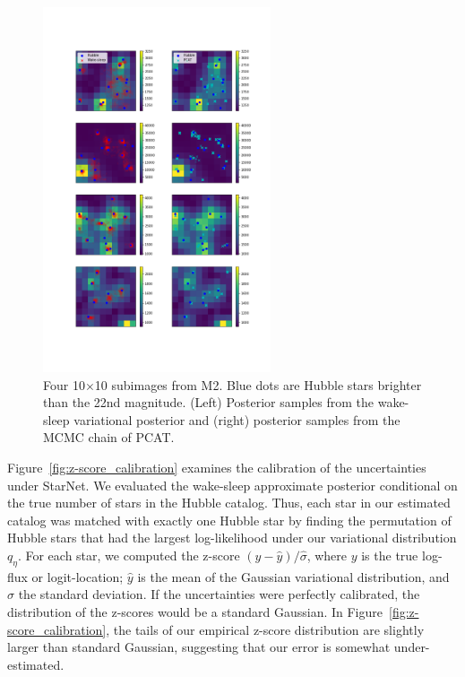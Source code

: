 \begin{figure}[H]
    \centering
    \includegraphics[width=0.6\textwidth]{figures/example_subimages_samples.png}
    \caption{Four 10$\times$10 subimages from
    M2. Blue dots are Hubble stars brighter than the 22nd magnitude. (Left) Posterior samples from the wake-sleep variational
    posterior and (right) posterior samples from the MCMC chain of PCAT. }
    \label{fig:example_subimages_sampled}
\end{figure}
\newpage

Figure~\ref{fig:z-score_calibration} examines the calibration of the uncertainties under StarNet. We evaluated the wake-sleep approximate posterior 
conditional on the true number of stars in the Hubble catalog. 
Thus, each star in our estimated catalog was matched with exactly one Hubble star
by finding the permutation of Hubble stars that had the largest log-likelihood under our variational distribution $q_\eta$. For each star, we computed the z-score $(y - \hat y) / \hat \sigma$, where $y$ is the true log-flux or 
logit-location; $\hat y$ is the mean of the Gaussian variational distribution, and $\hat\sigma$ the standard deviation.
If the uncertainties were perfectly calibrated, the distribution of the z-scores would be a standard Gaussian. 
In Figure~\ref{fig:z-score_calibration}, the tails of our empirical z-score distribution are slightly larger than standard Gaussian, suggesting that our error is somewhat under-estimated. 

